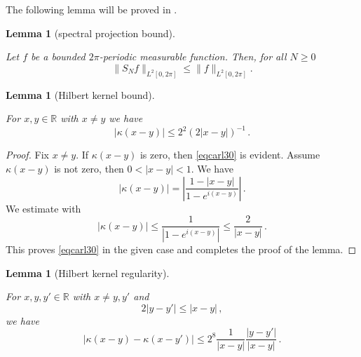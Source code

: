 \documentclass[10pt,a4paper]{article}
\theoremstyle{plain}
\newtheorem{lemma}[theorem]{Lemma}
\theoremstyle{definition}
\numberwithin{equation}{subsection}
\newcommand{\R}{{\mathbb{R}}}
\newcommand{\lean}[1]{}
\newcommand{\uses}[1]{}
\newcommand{\leanok}{}
\begin{document}
The following lemma will be proved in .

\begin{lemma}[spectral projection bound]
\label{spectral-projection-bound}
\leanok
\lean{spectral_projection_bound}
    Let $f$ be a bounded $2\pi$-periodic measurable function. Then, for all $N\ge 0$
   \begin{equation}\label{snbound}
   \|S_Nf\|_{L^2[0, 2\pi]} \le \|f\|_{L^2[0, 2\pi]}.
   \end{equation}
\end{lemma}

\begin{lemma}[Hilbert kernel bound]
\label{Hilbert-kernel-bound}
\leanok
\lean{Hilbert_kernel_bound}
\uses{lower-secant-bound}
    For $x,y\in \R$ with $x\neq y$ we have
    \begin{equation}\label{eqcarl30}
        |\kappa(x-y)|\le 2^2(2|x-y|)^{-1}\, .
    \end{equation}
\end{lemma}
\begin{proof}
\leanok
    Fix $x\neq y$. If $\kappa(x-y)$ is zero, then \eqref{eqcarl30} is evident. Assume $\kappa(x-y)$ is not zero, then $0<|x-y|<1$.
    We have
\begin{equation}\label{eqcarl31}
|\kappa(x-y)|=\left|\frac {1-|x-y|}{1-e^{i(x-y)}}\right|\, .
\end{equation}
We estimate
with 
\begin{equation}\label{eqcarl311}
|\kappa(x-y)|\le \frac {1}{|1-e^{i(x-y)}|}\le \frac 2{|x-y|}\, .
\end{equation}
This proves \eqref{eqcarl30} in the given case and completes the proof of the lemma.
\end{proof}

\begin{lemma}[Hilbert kernel regularity]
\label{Hilbert-kernel-regularity}
\leanok
\lean{Hilbert_kernel_regularity}
\uses{lower-secant-bound}
    For $x,y,y'\in \R$ with $x\neq y,y'$ and
    \begin{equation}
        \label{eq-close-hoelder}
        2|y-y'|\le |x-y|\, ,
    \end{equation}
    we have
    \begin{equation}\label{eqcarl301}
        |\kappa(x-y) - \kappa(x-y')|\le 2^{8}\frac{1}{|x-y|} \frac{|y-y'|}{|x-y|}\, .
    \end{equation}
\end{lemma}
\end{document}
